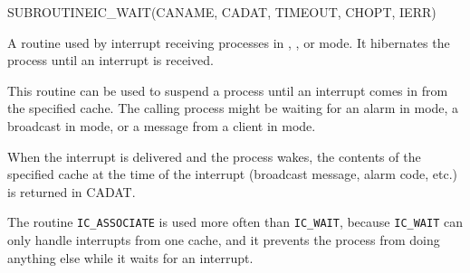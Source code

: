 \begin{routine} %
\subroutine
   {SUBROUTINE}{IC\_WAIT}{(CANAME, CADAT, TIMEOUT, CHOPT, IERR)}
\begin{overview}
A routine used by interrupt receiving processes in \broadcast,
\alarm, or \mailbox mode. It hibernates the process until an
interrupt is received.

\end{overview}
\begin{argdeflist}
\end{argdeflist}
\begin{describe}

This routine can be used to suspend a process until an interrupt comes
in from the specified cache. The calling process might be waiting for
an alarm in \alarm mode, a broadcast in \broadcast mode, or a message
from a client in \mailbox mode.

When the interrupt is delivered and the process wakes, the contents
of the specified cache at the time of the interrupt (broadcast message,
alarm code, etc.) is returned in CADAT.

The routine \verb|IC_ASSOCIATE| is used more often than \verb|IC_WAIT|,
because \verb|IC_WAIT| can only handle interrupts from one cache, and
it prevents the process from doing anything else while it waits for
an interrupt.

\end{describe}
\begin{options}
\end{options}
\begin{returncodes}
\end{returncodes}
\end{routine}

